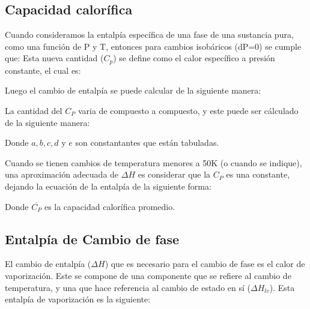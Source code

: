 \subsection{Capacidad calorífica}

Cuando consideramos la entalpía específica de una fase de una sustancia pura, como una función de P y T, entonces para cambios isobáricos (dP=0) se cumple que:
Esta nueva cantidad ($C_p$) se define como el calor específico a presión constante, el cual es:


Luego el cambio de entalpía se puede calcular de la siguiente manera:

La cantidad del $C_P$ varia de compuesto a compuesto, y este puede ser cálculado de la siguiente manera:


Donde $a,b,c,d$ y $e$ son constantantes que están tabuladas.

Cuando se tienen cambios de temperatura menores a 50K (o cuando se indique), una aproximación adecuada de $\Delta H$ es considerar que la $C_P$ es una constante, dejando la ecuación de la entalpía de la siguiente forma:


Donde $\overline{C_P}$ es la capacidad calorífica promedio.

\subsection{Entalpía de Cambio de fase}

El cambio de entalpía ($\Delta H$) que es necesario para el cambio de fase es el calor de vaporización. Este se compone de una componente que se refiere al cambio de temperatura, y una que hace referencia al cambio de estado en sí ($\Delta H_{lv}$).
Esta entalpía de vaporización es la siguiente:


